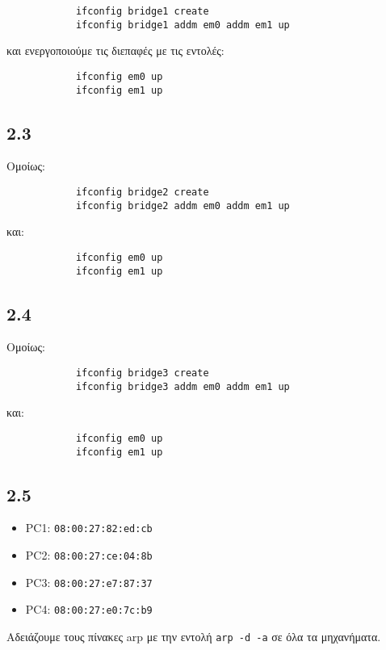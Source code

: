 \documentclass[a4paper, 12pt]{article}
\begin{document}
		\begin{verbatim}
			ifconfig bridge1 create
			ifconfig bridge1 addm em0 addm em1 up
		\end{verbatim}
		
		και ενεργοποιούμε τις διεπαφές με τις εντολές: 
		
		\begin{verbatim}
			ifconfig em0 up
			ifconfig em1 up
		\end{verbatim}

	\subsection*{2.3}
		Ομοίως:
		
		\begin{verbatim}
			ifconfig bridge2 create
			ifconfig bridge2 addm em0 addm em1 up
		\end{verbatim}
		
		και:
		
		\begin{verbatim}
			ifconfig em0 up
			ifconfig em1 up
		\end{verbatim}

	\subsection*{2.4}
		Ομοίως:
		
		\begin{verbatim}
			ifconfig bridge3 create
			ifconfig bridge3 addm em0 addm em1 up
		\end{verbatim}
		
		και:
		
		\begin{verbatim}
			ifconfig em0 up
			ifconfig em1 up
		\end{verbatim}

	\subsection*{2.5}
		\begin{itemize}
			\item PC1: \verb|08:00:27:82:ed:cb|
			\item PC2: \verb|08:00:27:ce:04:8b|
			\item PC3: \verb|08:00:27:e7:87:37|
			\item PC4: \verb|08:00:27:e0:7c:b9|
		\end{itemize}
		
		Αδειάζουμε τους πίνακες arp με την εντολή \verb|arp -d -a| σε όλα τα μηχανήματα.
\end{document}
